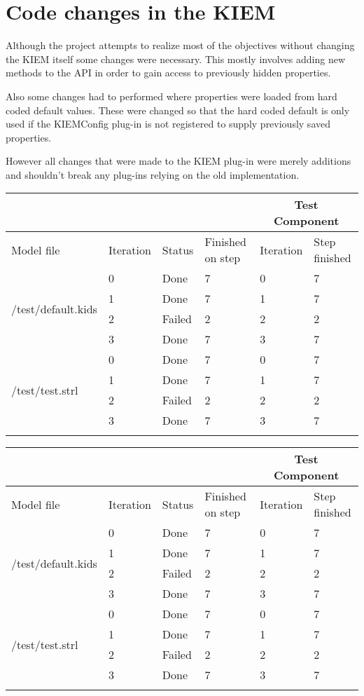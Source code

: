 \chapter{Code changes in the \ac{KIEM}}
\label{chapter:KiemChanges}
Although the project attempts to realize most of the objectives without
changing the \ac{KIEM} itself some changes were necessary.
This mostly involves adding new methods to the \ac{API} in order to
gain access to previously hidden properties.

Also some changes had to performed where properties were loaded from hard
coded default values. These were changed so that the hard coded default is
only used if the \ac{KIEMConfig} plug-in is not registered to supply previously
saved properties.

However all changes that were made to the \ac{KIEM} plug-in were merely additions
and shouldn't break any plug-ins relying on the old implementation.

\begin{tabular}{| l | l | l | p{1.2cm} | l | l | } \hline
\multicolumn{4}{|c|}{}
 & \multicolumn{2}{c|}{Test Component}
\\ \hline
Model file & Iteration & Status & Finished on step & Iteration & Step finished \\ \hline
\multirow{4}{*}{/test/default.kids} & 0 & Done & 7 & 0 & 7 \\ 
 & 1 & Done & 7 & 1 & 7 \\ 
 & 2 & Failed & 2 & 2 & 2 \\ 
 & 3 & Done & 7 & 3 & 7 \\ 
\hline
\multirow{4}{*}{/test/test.strl} & 0 & Done & 7 & 0 & 7 \\ 
 & 1 & Done & 7 & 1 & 7 \\ 
 & 2 & Failed & 2 & 2 & 2 \\ 
 & 3 & Done & 7 & 3 & 7 \\ 
\hline
\label{figure:autoTest[test]Output}
\end{tabular}

\begin{tabular}{| l | l | l | p{1.2cm} | l | l | } \hline
\multicolumn{4}{|c|}{}
 & \multicolumn{2}{c|}{Test Component}
\\ \hline
Model file & Iteration & Status & Finished on step & Iteration & Step finished \\ \hline
\multirow{4}{*}{/test/default.kids} & 0 & Done & 7 & 0 & 7 \\ 
 & 1 & Done & 7 & 1 & 7 \\ 
 & 2 & Failed & 2 & 2 & 2 \\ 
 & 3 & Done & 7 & 3 & 7 \\ 
\hline
\multirow{4}{*}{/test/test.strl} & 0 & Done & 7 & 0 & 7 \\ 
 & 1 & Done & 7 & 1 & 7 \\ 
 & 2 & Failed & 2 & 2 & 2 \\ 
 & 3 & Done & 7 & 3 & 7 \\ 
\hline
\label{figure:autoTest2[test]Output}
\end{tabular}
